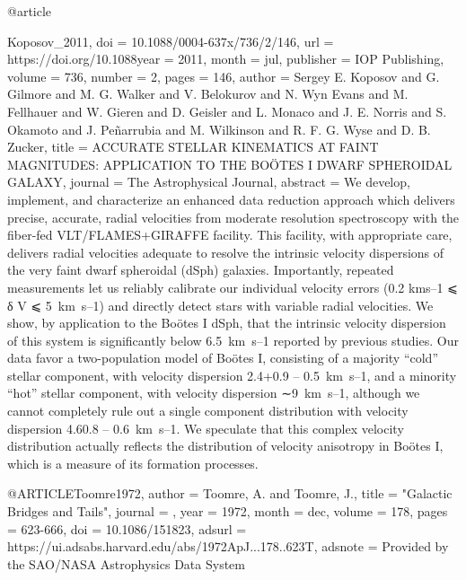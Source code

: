 \documentclass[apj]{emulateapj}
\begin{document}
{{{{{{{{{{{{{{{@article{Koposov_2011,
	doi = {10.1088/0004-637x/736/2/146},
	url = {https://doi.org/10.1088year = 2011,
	month = {jul},
	publisher = {{IOP} Publishing},
	volume = {736},
	number = {2},
	pages = {146},
	author = {Sergey E. Koposov and G. Gilmore and M. G. Walker and V. Belokurov and N. Wyn Evans and M. Fellhauer and W. Gieren and D. Geisler and L. Monaco and J. E. Norris and S. Okamoto and J. Pe{\~{n}}arrubia and M. Wilkinson and R. F. G. Wyse and D. B. Zucker},
	title = {{ACCURATE} {STELLAR} {KINEMATICS} {AT} {FAINT} {MAGNITUDES}: {APPLICATION} {TO} {THE} {BOÖTES} I {DWARF} {SPHEROIDAL} {GALAXY}},
	journal = {The Astrophysical Journal},
	abstract = {We develop, implement, and characterize an enhanced data reduction approach which delivers precise, accurate, radial velocities from moderate resolution spectroscopy with the fiber-fed VLT/FLAMES+GIRAFFE facility. This facility, with appropriate care, delivers radial velocities adequate to resolve the intrinsic velocity dispersions of the very faint dwarf spheroidal (dSph) galaxies. Importantly, repeated measurements let us reliably calibrate our individual velocity errors (0.2 kms–1 ⩽ δ
               V
             ⩽ 5 km s–1) and directly detect stars with variable radial velocities. We show, by application to the Boötes I dSph, that the intrinsic velocity dispersion of this system is significantly below 6.5 km s–1 reported by previous studies. Our data favor a two-population model of Boötes I, consisting of a majority “cold” stellar component, with velocity dispersion 2.4+0.9
            – 0.5 km s–1, and a minority “hot” stellar component, with velocity dispersion ∼9 km s–1, although we cannot completely rule out a single component distribution with velocity dispersion 4.60.8
            – 0.6 km s–1. We speculate that this complex velocity distribution actually reflects the distribution of velocity anisotropy in Boötes I, which is a measure of its formation processes.}
}


@ARTICLE{Toomre1972,
   author = {{Toomre}, A. and {Toomre}, J.},
    title = "{Galactic Bridges and Tails}",
  journal = {\apj},
     year = 1972,
    month = dec,
   volume = 178,
    pages = {623-666},
      doi = {10.1086/151823},
   adsurl = {https://ui.adsabs.harvard.edu/abs/1972ApJ...178..623T},
  adsnote = {Provided by the SAO/NASA Astrophysics Data System}
}




}}}}}}}}}}}}}}}}
\end{document}
